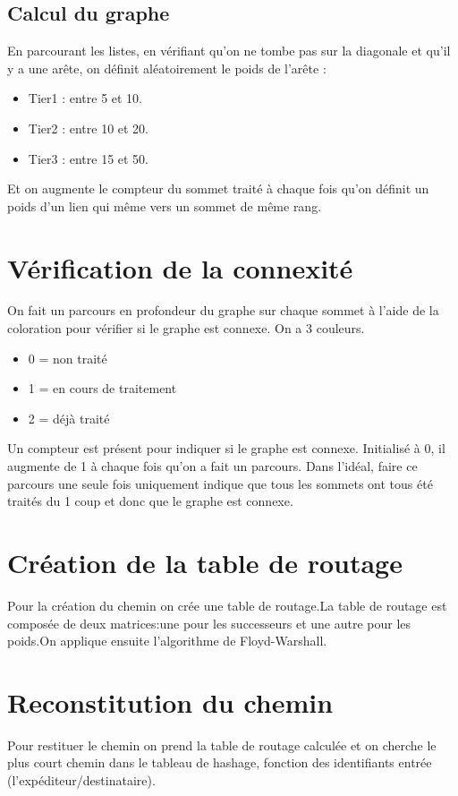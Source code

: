 \documentclass[a4paper,11pt]{report}
\begin{document}
\subsection{Calcul du graphe}
En parcourant les listes, en vérifiant qu'on ne tombe pas sur la diagonale et qu'il y a une arête, on définit aléatoirement le poids de l'arête : 
\begin{itemize}
\item Tier1 : entre 5 et 10.
\item Tier2 : entre 10 et 20.
\item Tier3 : entre 15 et 50.
\end{itemize} 
Et on augmente le compteur du sommet traité à chaque fois qu'on définit un poids d'un lien qui même vers un sommet de même rang.

\section{Vérification de la connexité}

On fait un parcours en profondeur du graphe sur chaque sommet à l'aide de la coloration pour vérifier si le graphe est connexe. On a 3 couleurs.
\begin{itemize}
\item 0 = non traité
\item 1 = en cours de traitement
\item 2 = déjà traité
\end{itemize}
Un compteur est présent pour indiquer si le graphe est connexe. Initialisé à 0, il augmente de 1 à chaque fois qu'on a fait un parcours. Dans l'idéal, faire ce parcours une seule fois uniquement indique que tous les sommets ont tous été traités du 1\ier{} coup et donc que le graphe est connexe.

\section{Création de la table de routage}
Pour la création du chemin on crée une table de routage.La table de routage est composée de deux matrices:une pour les successeurs et une autre pour les poids.On applique ensuite l'algorithme de Floyd-Warshall.

\section{Reconstitution du chemin}
Pour restituer le chemin on prend la table de routage calculée et on cherche le plus court chemin dans le tableau de hashage, fonction des identifiants entrée (l'expéditeur/destinataire).
\end{document}
